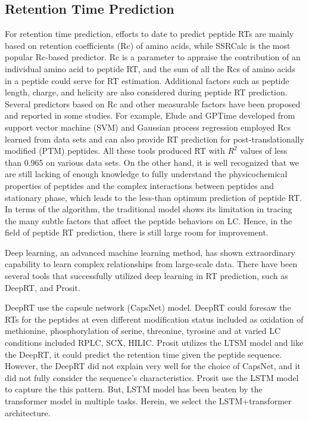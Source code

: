 \subsection{Retention Time Prediction}
For retention time prediction, efforts to date to predict peptide RTs are mainly based on retention coefficients (Rc) of amino acids,
while SSRCalc\cite{guo1986prediction} is the most popular Rc-based predictor. Rc is a parameter to appraise the contribution of an individual amino
acid to peptide RT, and the sum of all the Rcs of amino acids in a peptide could serve for RT estimation.
Additional factors such as peptide length, charge, and helicity are also considered during peptide RT prediction.
Several predictors based on Rc and other measurable factors have been proposed and reported in some studies. For example, Elude\cite{moruz2010training,moruz2012chromatographic} and GPTime\cite{maboudi2017uncertainty} developed from support vector machine (SVM) and Gaussian process
regression employed Rcs learned from data sets and can also provide RT prediction for post-translationally modiﬁed (PTM) peptides.
All these tools produced RT with $R^2$ values of less than 0.965 on various data sets. On the other hand, it is well recognized
that we are still lacking of enough knowledge to fully understand the physicochemical properties of peptides and the complex
interactions between peptides and stationary phase, which leads to the less-than optimum prediction of peptide RT. In terms
of the algorithm, the traditional model shows its limitation in tracing the many subtle factors that affect the peptide behaviors
on LC. Hence, in the ﬁeld of peptide RT prediction, there is still large room for improvement.

Deep learning, an advanced machine learning method, has shown extraordinary capability to learn complex relationships
from large-scale data. There have been several tools that successfully utilized deep learning in RT prediction, such as
DeepRT\cite{ma2018improved}, and Prosit\cite{gessulat2019prosit}.

DeepRT use the capsule network (CapsNet) \cite{sabour2017dynamic}
model. DeepRT could foresaw the RTs for the peptides at even different modiﬁcation status included as oxidation of methionine, phosphorylation of
serine, threonine, tyrosine and at varied LC conditions included RPLC, SCX, HILIC.
Prosit utilizes the LTSM model and like the DeepRT, it could predict the retention time given the peptide sequence.
However, the DeepRT did not explain very well for the choice of CapsNet, and it did not fully consider the sequence's characteristics.
Prosit use the LSTM model to capture the this pattern. But, LSTM model has been beaten by the transformer model
in multiple tasks\cite{vaswani2017attention}. Herein, we select the LSTM+transformer architecture.

